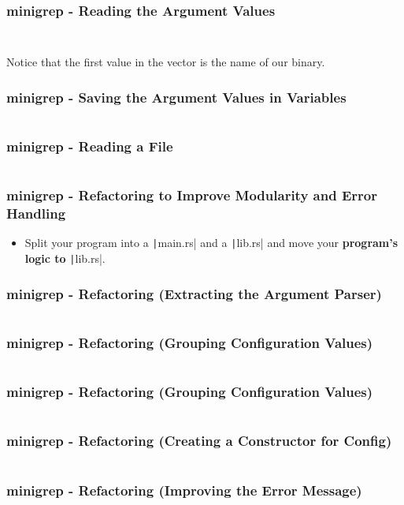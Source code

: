\documentclass{beamer}
\begin{document}
\begin{frame}[fragile]
	\frametitle{minigrep - Reading the Argument Values}
	\inputminted[fontsize=\scriptsize]{rust}{./code/grep1.rs}
	
	\inputminted[fontsize=\scriptsize]{shell}{./code/grep1.shell}
	
	Notice that the first value in the vector is the name of our binary.
\end{frame}

\begin{frame}[fragile]
	\frametitle{minigrep - Saving the Argument Values in Variables}
	\inputminted{rust}{./code/grep2.rs}
\end{frame}

\begin{frame}[fragile]
	\frametitle{minigrep - Reading a File}
	\inputminted{rust}{./code/grep3.rs}
\end{frame}

\begin{frame}[fragile]
	\frametitle{minigrep - Refactoring to Improve Modularity and Error Handling}
	\begin{itemize}
		\item Split your program into a \texttt|main.rs| and a \texttt|lib.rs| and move your \textbf{program’s logic to} \texttt|lib.rs|.
	\end{itemize}
\end{frame}

\begin{frame}[fragile]
	\frametitle{minigrep - Refactoring (Extracting the Argument Parser)}
	\inputminted{rust}{./code/grep4.rs}
\end{frame}

\begin{frame}[fragile]
	\frametitle{minigrep - Refactoring (Grouping Configuration Values)}
	\inputminted{rust}{./code/grep5.rs}
\end{frame}


\begin{frame}[fragile]
	\frametitle{minigrep - Refactoring (Grouping Configuration Values)}
	\inputminted{rust}{./code/grep5.rs}
\end{frame}

\begin{frame}[fragile]
	\frametitle{minigrep - Refactoring (Creating a Constructor for Config)}
	\inputminted{rust}{./code/grep6.rs}
\end{frame}

\begin{frame}[fragile]
	\frametitle{minigrep - Refactoring (Improving the Error Message)}
	\inputminted{rust}{./code/grep7.rs}
\end{frame}
\end{document}
